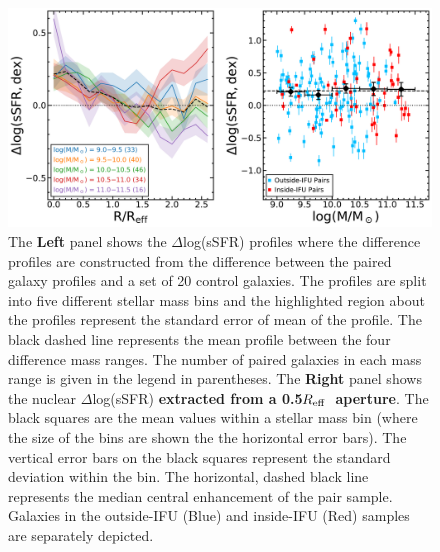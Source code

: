\documentclass[iop,revtex4,twocolumn,apj,numberedappendix,appendixfloats]{emulateapj}
\newcommand{\reff}{$R_{\rm eff}$}
\begin{document}
\begin{figure}
\centering
\includegraphics[width=0.8\linewidth]{fig/ssfr_mass.pdf}
\caption[]{The \textbf{Left} panel shows the $\Delta$log(sSFR) profiles where the difference profiles are constructed from the difference between the paired galaxy profiles and a set of 20 control galaxies. The profiles are split into five different stellar mass bins and the highlighted region about the profiles represent the standard error of mean of the profile. The black dashed line represents the mean profile between the four difference mass ranges. The number of paired galaxies in each mass range is given in the legend in parentheses. The \textbf{Right} panel shows the nuclear $\Delta$log(sSFR) \textbf{extracted from a 0.5\reff\ aperture}. The black squares are the mean values within a stellar mass bin (where the size of the bins are shown the the horizontal error bars). The vertical error bars on the black squares represent the standard deviation within the bin. The horizontal, dashed black line represents the median central enhancement of the pair sample. Galaxies in the outside-IFU (Blue) and inside-IFU (Red) samples are separately depicted.
}
\label{fig:ssfr_mass}
\end{figure}
\end{document}
